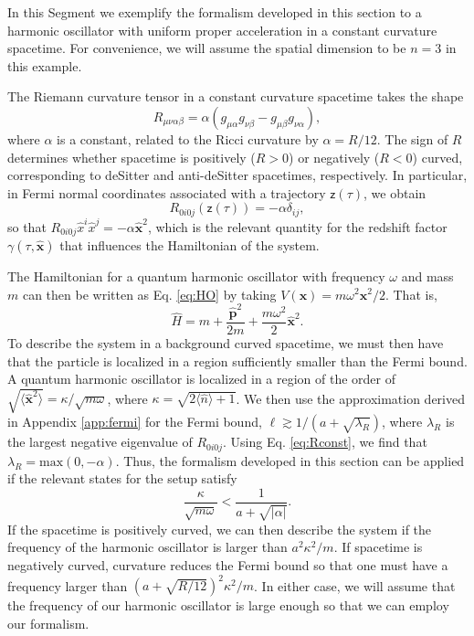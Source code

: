 \documentclass[letterpaper,12pt,titlepage,oneside,final]{book}
\newcommand{\mf}{\mathsf}%
\begin{document}
In this Segment we exemplify the formalism developed in this section to a harmonic oscillator with uniform proper acceleration in a constant curvature spacetime. For convenience, we will assume {the spatial dimension to be} $n=3$ in this example.

The Riemann curvature tensor in a constant curvature spacetime takes the shape
\begin{equation}
    R_{\mu\nu\alpha\beta} = \alpha (g_{\mu\alpha}g_{\nu \beta} - g_{\mu\beta}g_{\nu\alpha}),
\end{equation}
where $\alpha$ is a constant, related to the Ricci curvature by $\alpha = R/12$. The sign of $R$ determines whether spacetime is positively ($R>0$) or negatively ($R<0$) curved, corresponding to deSitter and anti-deSitter spacetimes, respectively. In particular, in Fermi normal coordinates associated with a trajectory $\mf{z}(\tau)$, we obtain
\begin{equation}\label{eq:Rconst}
    R_{0i0j}(\mf z(\tau)) = -\alpha\delta_{ij},
\end{equation}
so that $R_{0i0j}\hat{x}^i \hat{x}^j = -\alpha \hat{\bm x}^2$, which is the relevant quantity for the redshift factor $\gamma(\tau,\hat{\bm x})$ that influences the Hamiltonian of the system.

The Hamiltonian for a quantum harmonic oscillator with frequency $\omega$ and mass $m$ can then be written as Eq. \eqref{eq:HO} by taking $V(\bm x) = m \omega^2 \bm x^2/2$. That is,
\begin{equation}
    \hat{H} = m + \frac{\hat{\bm p}^2}{2m} + \frac{m \omega^2}{2}\hat{\bm x}^2.
\end{equation}
To describe the system in a background curved spacetime, we must then have that the particle is localized in a region sufficiently smaller than the Fermi bound. A quantum harmonic oscillator is localized in a region of the order of $\sqrt{\langle\hat{\bm x}^2\rangle}=\kappa/\sqrt{m\omega}$, where $\kappa=\sqrt{2\langle\hat{n}\rangle+1}$. We then use the approximation derived in Appendix \ref{app:fermi} for the Fermi bound, $\ell \gtrsim 1/(a+\sqrt{\lambda_R})$, where $\lambda_R$ is the largest negative eigenvalue of $R_{0i0j}$. Using Eq. \eqref{eq:Rconst}, we find that $\lambda_R = \text{max}(0,-\alpha)$. Thus, the formalism developed in this section can be applied if the relevant states for the setup satisfy
\begin{equation}
    \frac{\kappa}{\sqrt{m \omega}}<\frac{1}{a + \sqrt{|\alpha|}}.
\end{equation}
If the spacetime is positively curved, we can then describe the system if the frequency of the harmonic oscillator is larger than $a^2\kappa^2/m$. If spacetime is negatively curved, curvature reduces the Fermi bound so that one must have a frequency larger than $(a+ \sqrt{R/12})^2\kappa^2/m$. In either case, we will assume that the frequency of our harmonic oscillator is large enough so that we can employ our formalism.
\end{document}
